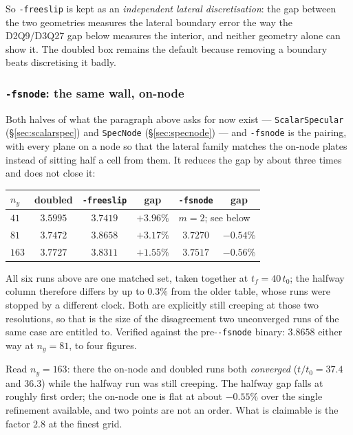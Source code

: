 \documentclass[11pt,a4paper]{article}
\newcommand{\code}[1]{\texttt{\small #1}}
\begin{document}
So \code{-freeslip} is kept as an \emph{independent lateral discretisation}: the
gap between the two geometries measures the lateral boundary error the way the
D2Q9/D3Q27 gap below measures the interior, and neither geometry alone can show
it. The doubled box remains the default because removing a boundary beats
discretising it badly.

\subsubsection{\texttt{-fsnode}: the same wall, on-node}
\label{sec:fsnode}

Both halves of what the paragraph above asks for now exist ---
\code{ScalarSpecular} (\S\ref{sec:scalarspec}) and \code{SpecNode}
(\S\ref{sec:specnode}) --- and \code{-fsnode} is the pairing, with every plane on
a node so that the lateral family matches the on-node plates instead of sitting
half a cell from them. It reduces the gap by about three times and does not close
it:

\begin{center}\small
\begin{tabular}{lccccc}
\toprule
$n_y$ & doubled & \code{-freeslip} & gap & \code{-fsnode} & gap \\
\midrule
$41$  & $3.5995$ & $3.7419$ & $+3.96\%$ & \multicolumn{2}{l}{$m=2$; see below} \\
$81$  & $3.7472$ & $3.8658$ & $+3.17\%$ & $3.7270$ & $-0.54\%$ \\
$163$ & $3.7727$ & $3.8311$ & $+1.55\%$ & $3.7517$ & $-0.56\%$ \\
\bottomrule
\end{tabular}
\end{center}

\noindent All six runs above are one matched set, taken together at
$t_f=40\,t_0$; the halfway column therefore differs by up to $0.3\%$ from the
older table, whose runs were stopped by a different clock. Both are explicitly
still creeping at those two resolutions, so that is the size of the disagreement
two unconverged runs of the same case are entitled to. Verified against the
pre-\code{-fsnode} binary: $3.8658$ either way at $n_y=81$, to four figures.

Read $n_y=163$: there the on-node and doubled runs both \emph{converged}
($t/t_0=37.4$ and $36.3$) while the halfway run was still creeping. The halfway
gap falls at roughly first order; the on-node one is flat at about $-0.55\%$ over
the single refinement available, and two points are not an order. What is
claimable is the factor $2.8$ at the finest grid.
\end{document}
